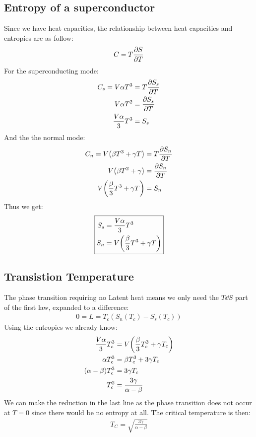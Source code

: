 \documentclass[12pt]{article}
\begin{document}
\subsection{Entropy of a superconductor}
Since we have heat capacities, the relationship between heat capacities and entropies are as follow:
\begin{align*}
  C=T\pdv{S}{T}
\end{align*}
For the superconducting mode:
\begin{align*}
  C_s=V\alpha T^3&=T\pdv{S_s}{T}\\
  V\alpha T^2&=\pdv{S_s}{T}\\
  \frac{V\alpha}{3}T^3&=S_s
\end{align*}
And the the normal mode:
\begin{align*}
  C_n=V\qty(\beta T^3+\gamma T)&=T\pdv{S_n}{T}\\
  V\qty(\beta T^2+\gamma)&=\pdv{S_n}{T}\\
  V\qty(\frac\beta3T^3+\gamma T)&=S_n
\end{align*}
Thus we get:
\begin{equation}
  \boxed{
    \begin{aligned}
      S_s&=\frac{V\alpha}{3}T^3\\
      S_n&=V\qty(\frac\beta3T^3+\gamma T)
    \end{aligned}
  }
\end{equation}
\subsection{Transistion Temperature}
The phase transition requiring no Latent heat means we only need the $T\dd{S}$ part of the first law, expanded to a difference:
\begin{align*}
  0=L=T_c(S_n(T_c)-S_s(T_c))
\end{align*}
Using the entropies we already know:
\begin{align*}
  \frac{V\alpha}{3}T_c^3&=V\qty(\frac\beta3T_c^3+\gamma T_c)\\
  \alpha T_c^3&=\beta T_c^3+3\gamma T_c\\
  \qty(\alpha-\beta)T_c^3&=3\gamma T_c\\
  T_c^2&=\frac{3\gamma}{\alpha-\beta}
\end{align*}
We can make the reduction in the last line as the phase transition does not occur at $T=0$ since there would be no entropy at all. The critical temperature is then:
\begin{align}
  \boxed{T_C=\sqrt{\frac{3\gamma}{\alpha-\beta}}}
\end{align}
\newpage
\end{document}

